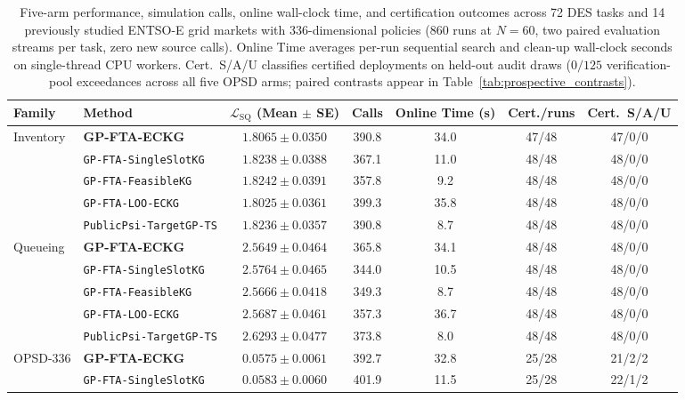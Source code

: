 \begin{table}[htbp]
\centering
\caption{Five-arm performance, simulation calls, online wall-clock time, and certification outcomes across 72 DES tasks and 14 previously studied ENTSO-E grid markets with 336-dimensional policies ($860$ runs at $N=60$, two paired evaluation streams per task, zero new source calls). Online Time averages per-run sequential search and clean-up wall-clock seconds on single-thread CPU workers. Cert.\ S/A/U classifies certified deployments on held-out audit draws ($0/125$ verification-pool exceedances across all five OPSD arms; paired contrasts appear in Table~\ref{tab:prospective_contrasts}).}\label{tab:prospective_main}
\footnotesize
\setlength{\tabcolsep}{5.5pt}
\begin{tabular}{llccccc}
\toprule
\textbf{Family} & \textbf{Method} & \textbf{$\mathcal{L}_{\mathrm{SQ}}$ (Mean $\pm$ SE)} & \textbf{Calls} & \textbf{Online Time (s)} & \textbf{Cert./runs} & \textbf{Cert.\ S/A/U} \\
\midrule
\multirow{5}{*}{Inventory} & \textbf{GP-FTA-ECKG} & $1.8065 \pm 0.0350$ & 390.8 & 34.0 & 47/48 & 47/0/0 \\
 & \texttt{GP-FTA-SingleSlotKG} & $1.8238 \pm 0.0388$ & 367.1 & 11.0 & 48/48 & 48/0/0 \\
 & \texttt{GP-FTA-FeasibleKG} & $1.8242 \pm 0.0391$ & 357.8 & 9.2 & 48/48 & 48/0/0 \\
 & \texttt{GP-FTA-LOO-ECKG} & $\mathbf{1.8025} \pm 0.0361$ & 399.3 & 35.8 & 48/48 & 48/0/0 \\
 & \texttt{PublicPsi-TargetGP-TS} & $1.8236 \pm 0.0357$ & 390.8 & 8.7 & 48/48 & 48/0/0 \\
\midrule
\multirow{5}{*}{Queueing} & \textbf{GP-FTA-ECKG} & $\mathbf{2.5649} \pm 0.0464$ & 365.8 & 34.1 & 48/48 & 48/0/0 \\
 & \texttt{GP-FTA-SingleSlotKG} & $2.5764 \pm 0.0465$ & 344.0 & 10.5 & 48/48 & 48/0/0 \\
 & \texttt{GP-FTA-FeasibleKG} & $2.5666 \pm 0.0418$ & 349.3 & 8.7 & 48/48 & 48/0/0 \\
 & \texttt{GP-FTA-LOO-ECKG} & $2.5687 \pm 0.0461$ & 357.3 & 36.7 & 48/48 & 48/0/0 \\
 & \texttt{PublicPsi-TargetGP-TS} & $2.6293 \pm 0.0477$ & 373.8 & 8.0 & 48/48 & 48/0/0 \\
\midrule
\multirow{5}{*}{OPSD-336} & \textbf{GP-FTA-ECKG} & $0.0575 \pm 0.0061$ & 392.7 & 32.8 & 25/28 & 21/2/2 \\
 & \texttt{GP-FTA-SingleSlotKG} & $0.0583 \pm 0.0060$ & 401.9 & 11.5 & 25/28 & 22/1/2 \\

\end{tabular}
\end{table}
